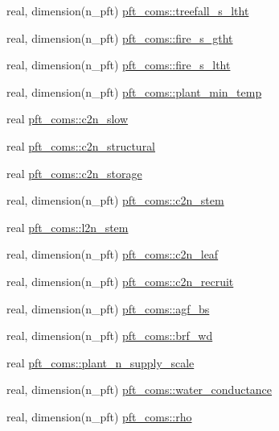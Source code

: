 \begin{DoxyCompactItemize}
real, dimension(n\+\_\+pft) \hyperlink{namespacepft__coms_af905b11e7eb1e1a30875d6b583839e92}{pft\+\_\+coms\+::treefall\+\_\+s\+\_\+ltht}
\item 
real, dimension(n\+\_\+pft) \hyperlink{namespacepft__coms_a41960519e8244a038e84c2fe44b9a752}{pft\+\_\+coms\+::fire\+\_\+s\+\_\+gtht}
\item 
real, dimension(n\+\_\+pft) \hyperlink{namespacepft__coms_ac154348fc689309b47112ac66a6df99d}{pft\+\_\+coms\+::fire\+\_\+s\+\_\+ltht}
\item 
real, dimension(n\+\_\+pft) \hyperlink{namespacepft__coms_ae13d0f409c782cf00abbc9f09f55a5a8}{pft\+\_\+coms\+::plant\+\_\+min\+\_\+temp}
\item 
real \hyperlink{namespacepft__coms_a4cd2632f30c0c38883e4191eb65e352b}{pft\+\_\+coms\+::c2n\+\_\+slow}
\item 
real \hyperlink{namespacepft__coms_a8ff9ca7160d6ae9774adc3a314d8accd}{pft\+\_\+coms\+::c2n\+\_\+structural}
\item 
real \hyperlink{namespacepft__coms_a2bdc4c753d41f0e863f3e00b13c8393f}{pft\+\_\+coms\+::c2n\+\_\+storage}
\item 
real, dimension(n\+\_\+pft) \hyperlink{namespacepft__coms_a45821066c1cdf886389c40c7ddbefa7f}{pft\+\_\+coms\+::c2n\+\_\+stem}
\item 
real \hyperlink{namespacepft__coms_aadbb3423514f8f93b48b2a626d4b000d}{pft\+\_\+coms\+::l2n\+\_\+stem}
\item 
real, dimension(n\+\_\+pft) \hyperlink{namespacepft__coms_a62386599b26b4cf8d478b513f813d974}{pft\+\_\+coms\+::c2n\+\_\+leaf}
\item 
real, dimension(n\+\_\+pft) \hyperlink{namespacepft__coms_ad105c123dc17ca1fb99476b476e035a4}{pft\+\_\+coms\+::c2n\+\_\+recruit}
\item 
real, dimension(n\+\_\+pft) \hyperlink{namespacepft__coms_a9d509e7c71beaa9054f49d583f01f433}{pft\+\_\+coms\+::agf\+\_\+bs}
\item 
real, dimension(n\+\_\+pft) \hyperlink{namespacepft__coms_aad5b7cd93696f04e149139562ce0f7be}{pft\+\_\+coms\+::brf\+\_\+wd}
\item 
real \hyperlink{namespacepft__coms_a519f5d42172d290ddad951a2744c5a20}{pft\+\_\+coms\+::plant\+\_\+n\+\_\+supply\+\_\+scale}
\item 
real, dimension(n\+\_\+pft) \hyperlink{namespacepft__coms_a57b4aabb4896e59800ec2159c64d06b3}{pft\+\_\+coms\+::water\+\_\+conductance}
\item 
real, dimension(n\+\_\+pft) \hyperlink{namespacepft__coms_aec4095886699dcf26ce469d85c675ed5}{pft\+\_\+coms\+::rho}

\end{DoxyCompactItemize}
